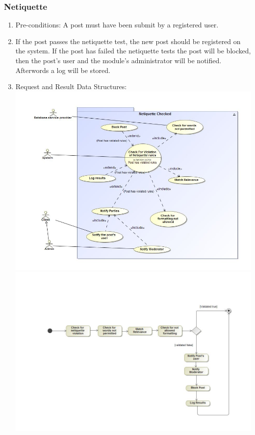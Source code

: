\documentclass[12pt, oneside]{article}
\begin{document}
\subsubsection{Netiquette}
\begin{enumerate}
 \item Pre-conditions: A post must have been submit by a registered user.
 \\
 
 \item If the post passes the netiquette test, the new post should be registered on the system. If the post has failed the netiquette tests the post will be blocked, then the post's user and the module's administrator will be notified. Afterwords a log will be stored.  
   \\
 \item Request and Result Data Structures:\\
  \includegraphics[scale=0.4]{netiquetteUseCase}\\
 \includegraphics[scale=0.35]{NetiquetteActivityDiagram} 
\end{enumerate}
\end{document}
